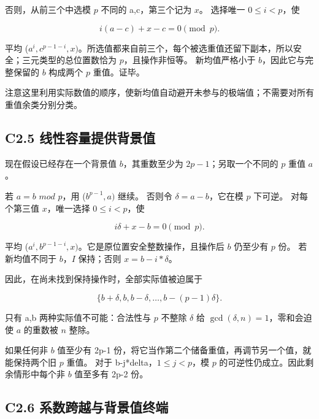 {否则，从前三个中选模} {\ensuremath{p}} {不同的} {a,c，第三个记为} {\ensuremath{x}。} {选择唯一} {\ensuremath{0\le i<p}，使}

\[
i(a-c)+x-c=0\pmod p.
\]

{平均} {(\ensuremath{a^{i},c^{p-1-i},x)}。所选值都来自前三个，每个被选重值还留下副本，所以安全；三元类型的总位置数恰为} {\ensuremath{p}，且操作非恒等。} {新均值严格小于} {\ensuremath{b}，因此它与完整保留的} {\ensuremath{b}} {构成两个} {\ensuremath{p}} {重值。证毕。}

{注意这里利用实际数值的顺序，使新均值自动避开未参与的极端值；不需要对所有重值余类分别分类。}

\subsection*{\texorpdfstring{{C2.5} {线性容量提供背景值}}{C2.5 线性容量提供背景值}}\label{C2-h8}

{现在假设已经存在一个背景值} \(b\){，其重数至少为} \(2p-1\){；另取一个不同的} \(p\) {重值} \(a\){。}

{若} {\ensuremath{a=b}} {\ensuremath{mod}} {\ensuremath{p}，用} {(\ensuremath{b^{p-1},a)}} {继续。} {否则令} {\ensuremath{\delta =a-b}，它在模} {\ensuremath{p}} {下可逆。} {对每个第三值} {\ensuremath{x}，唯一选择} {\ensuremath{0\le i<p}，使}

\[
i\delta+x-b=0\pmod p.
\]

{平均} {(\ensuremath{a^{i},b^{p-1-i},x)}。它是原位置安全整数操作，且操作后} {\ensuremath{b}} {仍至少有} {\ensuremath{p}} {份。} {若新均值不同于} {\ensuremath{b}，\ensuremath{I}} {保持；否则} {\ensuremath{x=b-i*\delta }。}

{因此，在尚未找到保持操作时，全部实际值被迫属于}

\[
\{b+\delta,b,b-\delta,\ldots,b-(p-1)\delta\}.
\tag{C2.5}
\]

{只有} {a,b} {两种实际值不可能：合法性与} {\ensuremath{p}} {不整除} {\ensuremath{\delta }} {给} {\ensuremath{\operatorname{gcd}(\delta ,n)=1}，零和会迫使} {\ensuremath{a}} {的重数被} {\ensuremath{n}} {整除。}

{如果任何非} {\ensuremath{b}} {值至少有} {2p-1} {份，将它当作第二个储备重值，再调节另一个值，就能保持两个旧} {\ensuremath{p}} {重值。} {对于} {b-j*delta，\ensuremath{1\le j<p}，模} {\ensuremath{p}} {的可逆性仍成立。因此剩余情形中每个非} {\ensuremath{b}} {值至多有} {2p-2} {份。}

\subsection*{\texorpdfstring{{C2.6} {系数跨越与背景值终端}}{C2.6 系数跨越与背景值终端}}\label{C2-h9}

